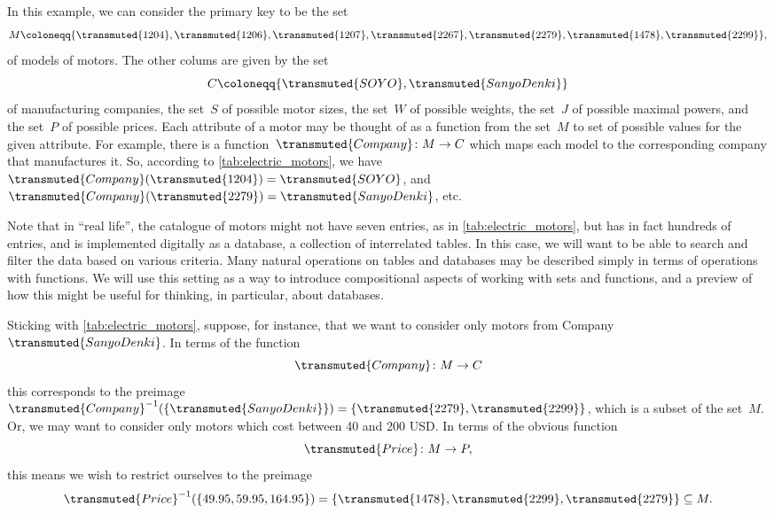 In this example, we can consider the primary key to be the set
\begin{equation*}
M \coloneqq \{ \transmuted{1204}, \transmuted{1206}, \transmuted{1207}, \transmuted{2267}, \transmuted{2279}, \transmuted{1478}, \transmuted{2299} \},
\end{equation*}
of models of motors. The other colums are given by the set
\begin{equation*}
    C \coloneqq \{ \transmuted{SOYO}, \transmuted{Sanyo Denki}\}
\end{equation*}
of manufacturing companies, the set~$S$ of possible motor sizes, the set~$W$ of possible weights, the set~$J$ of possible maximal powers, and the set~$P$ of possible prices. Each attribute of a motor may be thought of as a function from the set~$M$ to set of possible values for the given attribute. For example, there is a function~$\transmuted{Company}\colon M \to C$ which maps each model to the corresponding company that manufactures it. So, according to \cref{tab:electric_motors}, we have ~$\transmuted{Company}(\transmuted{1204}) = \transmuted{SOYO}$, and~$\transmuted{Company}(\transmuted{2279}) = \transmuted{Sanyo Denki}$, etc.

Note that in ``real life'', the catalogue of motors might not have seven entries, as in \cref{tab:electric_motors}, but has in fact hundreds of entries, and is implemented digitally as a database,  a collection of interrelated tables. In this case, we will want to be able to search and filter the data based on various criteria. Many natural operations on tables and databases may be described simply in terms of operations with functions. We will use this setting as a way to introduce compositional aspects of working with sets and functions, and a preview of how this might be useful for thinking, in particular, about databases.

Sticking with \cref{tab:electric_motors}, suppose, for instance, that we want to consider only motors from Company~$\transmuted{Sanyo Denki}$. In terms of the function
\begin{equation*}
\transmuted{Company}\colon M \to C
\end{equation*}
this corresponds to the preimage~$\transmuted{Company}^{-1}(\{ \transmuted{Sanyo Denki} \}) = \{ \transmuted{2279}, \transmuted{2299}\}$, which is a subset of the set~$M$. Or, we may want to consider only motors which cost between 40 and 200 USD. In terms of the obvious function
\begin{equation*}
\transmuted{Price}\colon M \to P,
\end{equation*}
this means we wish to restrict ourselves to the preimage
\begin{equation*}
\transmuted{Price}^{-1}(\{ 49.95, 59.95, 164.95\}) = \{ \transmuted{1478}, \transmuted{2299}, \transmuted{2279} \} \subseteq M.
\end{equation*}

